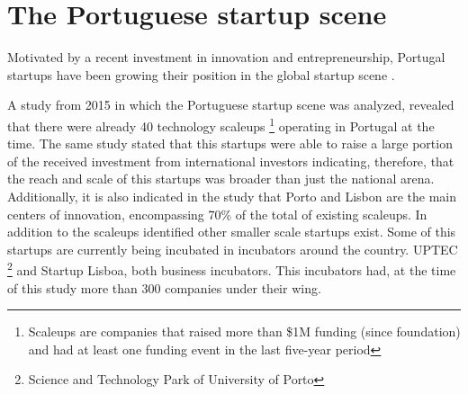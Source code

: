   	\section{The Portuguese startup scene} \label{sec:stateoftheart:sec:portuguesestartupscene}
    Motivated by a recent investment in innovation and entrepreneurship, Portugal startups have been growing their position in the global startup scene \cite{Coleman2015}.

    A study from 2015 \citet{StartupEuropePartnership2015} in which the Portuguese startup scene was analyzed, revealed that there were already 40 technology scaleups \footnote{Scaleups are companies that raised more than \$1M funding (since foundation) and had at least one funding event in the last five-year period } operating in Portugal at the time. The same study stated that this startups were able to raise a large portion of the received investment from international investors indicating, therefore, that the reach and scale of this startups was broader than just the national arena. Additionally, it is also indicated in the study that Porto and Lisbon are the main centers of innovation, encompassing 70\% of the total of existing scaleups. In addition to the scaleups identified other smaller scale startups exist. Some of this startups are currently being incubated in incubators around the country. UPTEC \footnote{Science and Technology Park of University of Porto} and Startup Lisboa, both business incubators. This incubators had, at the time of this study more than 300 companies \cite{Uptec,StartupLisboa} under their wing.


